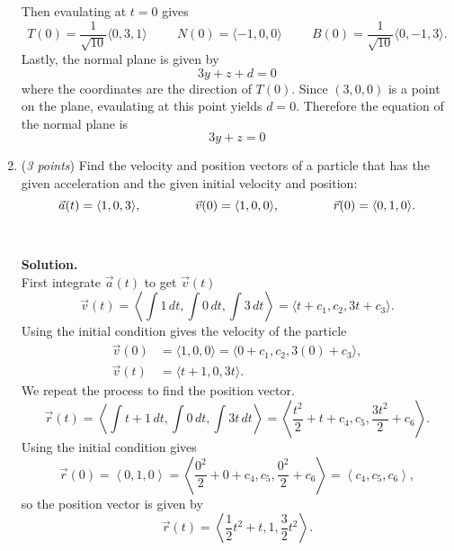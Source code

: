\documentclass[12 pt]{article}
\begin{document}
\begin{enumerate}
		Then evaulating at $t = 0$ gives \[
			T(0) = \frac{1}{\sqrt{10}}\langle 0, 3, 1 \rangle \hspace{1cm}
			N(0) = \langle -1, 0, 0\rangle \hspace{1cm}
			B(0) = \frac{1}{\sqrt{10}} \langle 0, -1, 3 \rangle.
		\]
		Lastly, the normal plane is given by \[
			3y + z + d = 0
		\] where the coordinates are the direction of $T(0)$. Since $(3, 0, 0)$ is a
		point on the plane, evaulating at this point yields $d = 0$. Therefore the
		equation of the normal plane is \[
			3y + z = 0
		\]
		\pagebreak
		\item (\textit{3 points})
		Find the velocity and position vectors of a particle that has the given
		acceleration and the given initial velocity and position: \[
			\vec a(t) = \langle 1, 0, 3 \rangle, \hspace{1.5cm}
			\vec v(0) = \langle 1, 0, 0 \rangle, \hspace{1.5cm}
			\vec r(0) = \langle 0, 1, 0 \rangle.
		\]
    \\~\\
    \textbf{Solution.}
		\\
		First integrate $\vec a(t)$ to get $\vec v(t)$ \[
		  \vec v(t)
			= \left\langle \int 1\,dt, \int0\,dt, \int3\,dt \right\rangle
			= \langle t + c_1, c_2, 3t + c_3 \rangle.
		\]
		Using the initial condition gives the velocity of the particle \begin{align*}
			\vec v(0) &= \langle 1, 0, 0 \rangle = \langle 0 + c_1, c_2, 3(0) + c_3 \rangle, \\
			\vec v(t) &= \langle t + 1, 0, 3t \rangle.
		\end{align*}
		We repeat the process to find the position vector. \[
			\vec r(t)
			= \left\langle \int t + 1\,dt, \int0\,dt, \int3t\,dt \right\rangle
			= \left\langle \frac{t^2}{2} + t + c_4, c_5, \frac{3t^2}{2} + c_6 \right\rangle.
		\] Using the initial condition gives \[
			\vec r(0)
			= \left\langle 0, 1, 0 \right\rangle
			= \left\langle \frac{0^2}{2} + 0 + c_4, c_5, \frac{0^2}{2} + c_6 \right\rangle
			= \left\langle c_4, c_5, c_6 \right\rangle,
		\] so the position vector is given by \[
			\vec r(t) = \left\langle \frac{1}{2}t^2 + t, 1, \frac{3}{2}t^2 \right\rangle.
		\]
  \end{enumerate}
\end{document}
